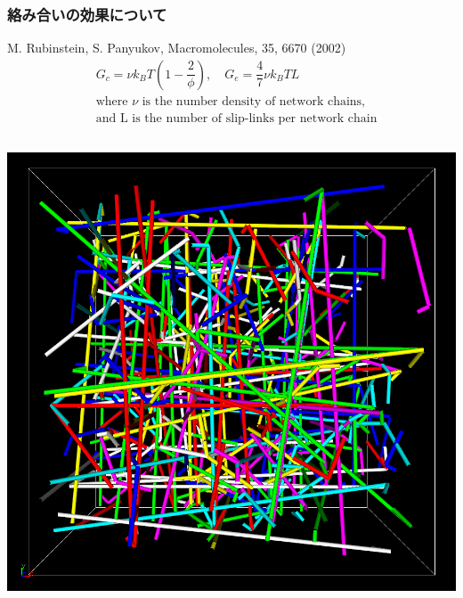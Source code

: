 \documentclass[12pt, dvipdfmx]{beamer}
\begin{document}
\begin{frame}
    \frametitle{絡み合いの効果について}
	\footnotesize
		M. Rubinstein, S. Panyukov, Macromolecules, 35, 6670 (2002)
			\begin{align*}
				&G_c = \nu k_B T \left(1-\dfrac{2}{\phi} \right), \quad G_e = \dfrac{4}{7} \nu k_B T L \\
				&\text{where $\nu$ is the number density of network chains,} \\
				& \text{and L is the number of slip-links per network chain}
			\end{align*}
		\vspace{-10mm}
		\begin{columns}[c, onlytextwidth]
				\vspace{-3mm}
				\begin{center}
					
					\includegraphics[width=.9\textwidth]{z_cord_NPT_4Chain.png}


\end{center}
\end{columns}
\end{frame}
\end{document}
